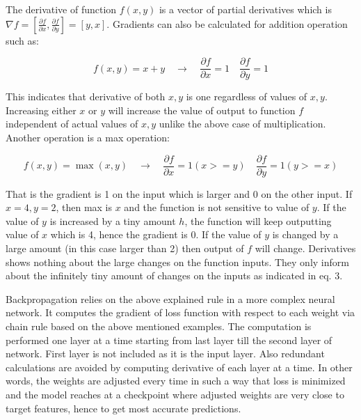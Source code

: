 \documentclass[11pt]{article}
\begin{document}
The derivative of function $f(x,y)$ is a vector of partial derivatives which is $\nabla f=\left[\frac{\partial f}{\partial x}, \frac{\partial f}{\partial y}\right]=[y, x]$. Gradients can also be calculated for addition operation such as:

\begin{equation}
f(x, y)=x+y \quad \rightarrow \quad \frac{\partial f}{\partial x}=1 \quad \frac{\partial f}{\partial y}=1
\end{equation}

This indicates that derivative of both $x,y$ is one regardless of values of $x,y$. Increasing either $x$ or $y$ will increase the value of output to function $f$ independent of actual values of $x,y$ unlike the above case of multiplication. Another operation is a max operation:

\begin{equation}
f(x, y)=\max (x, y) \quad \rightarrow \quad \frac{\partial f}{\partial x}=1(x>=y) \quad \frac{\partial f}{\partial y}=1(y>=x)
\end{equation}

That is the gradient is 1 on the input which is larger and 0 on the other input. If $x = 4, y=2$, then max is $x$ and the function is not sensitive to value of $y$. If the value of $y$ is increased by a tiny amount $h$, the function will keep outputting value of $x$ which is 4, hence the gradient is 0. If the value of $y$ is changed by a large amount (in this case larger than 2) then output of $f$ will change. Derivatives shows nothing about the large changes on the function inputs. They only inform about the infinitely tiny amount of changes on the inputs as indicated in eq. 3.

Backpropagation relies on the above explained rule in a more complex neural network. It computes the gradient of loss function with respect to each weight via chain rule based on the above mentioned examples. The computation is performed one layer at a time starting from last layer till the second layer of network. First layer is not included as it is the input layer. Also redundant calculations are avoided by computing derivative of each layer at a time. In other words, the weights are adjusted every time in such a way that loss is minimized and the model reaches at a checkpoint where adjusted weights are very close to target features, hence to get most accurate predictions.
\end{document}
